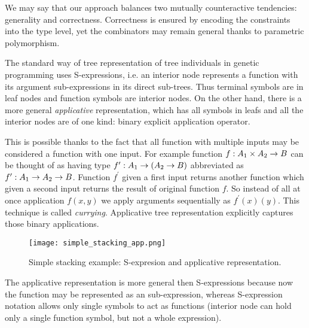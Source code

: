 \documentclass{ws-ijait}
\begin{document}

We may say that our approach balances two mutually counteractive tendencies: generality and correctness. Correctness is ensured by encoding the constraints into the type level, yet the combinators may remain general thanks to parametric polymorphism.





The standard way of tree representation of tree individuals in genetic programming uses S-expressions,
i.e. an interior node represents a function with its argument sub-expressions in its direct sub-trees. 
Thus terminal symbols are in leaf nodes and function symbols are interior nodes.
On the other hand, there is a more general \textit{applicative} representation, which has all symbols in leafs and all the interior nodes are of one kind: binary explicit application operator.

This is possible thanks to the fact that all function with multiple inputs may be considered a function with one input. For example function $f : A_1 \times A_2 \rightarrow B$ can be thought of as having type $f^\prime : A_1 \rightarrow (A_2 \rightarrow B)$ abbreviated as $f^\prime : A_1 \rightarrow A_2 \rightarrow B$. Function $f^\prime$ given a first input returns another function which given a second input returns the result of original function $f$. So instead of all at once application $f(x,y)$ we apply arguments sequentially as $f^\prime(x)(y)$. This technique is called \textit{currying}. Applicative tree representation explicitly captures those binary applications.

\begin{figure}[th]
\centerline{\texttt{[image: simple\_stacking\_app.png]}}
\vspace*{8pt}
\caption{Simple stacking example: S-expresion and applicative representation.}
\label{simple_stacking_app}
\end{figure}

The applicative representation is more general then S-expressions because now the function may be represented as an sub-expression, whereas S-expression notation allows only single symbols to act as functions (interior node can hold only a single function symbol, but not a whole expression).
\end{document}
